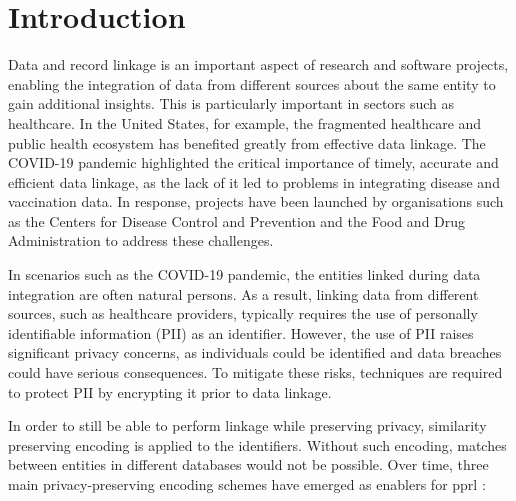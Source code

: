 
\chapter{Introduction}  \label{sec:introduction}
Data and record linkage is an important aspect of research and software projects, enabling the integration of data from different sources about the same entity to gain additional insights. This is particularly important in sectors such as healthcare. In the United States, for example, the fragmented healthcare and public health ecosystem has benefited greatly from effective data linkage. The COVID-19 pandemic highlighted the critical importance of timely, accurate and efficient data linkage, as the lack of it led to problems in integrating disease and vaccination data. In response, projects have been launched by organisations such as the Centers for Disease Control and Prevention and the Food and Drug Administration to address these challenges. \cite{pathak2024}

In scenarios such as the COVID-19 pandemic, the entities linked during data integration are often natural persons. As a result, linking data from different sources, such as healthcare providers, typically requires the use of personally identifiable information (PII) as an identifier. However, the use of PII raises significant privacy concerns, as individuals could be identified and data breaches could have serious consequences. To mitigate these risks, techniques are required to protect PII by encrypting it prior to data linkage. \cite{pathak2024}

In order to still be able to perform linkage while preserving privacy, similarity preserving encoding is applied to the identifiers. Without such encoding, matches between entities in different databases would not be possible. Over time, three main privacy-preserving encoding schemes have emerged as enablers for \ac{pprl} \cite{pathak2024, schaefer2024}: 

